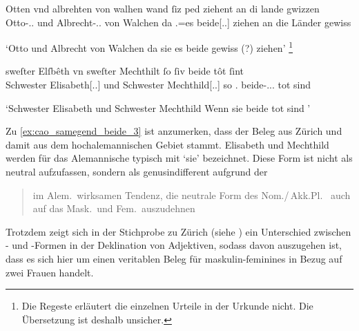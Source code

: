 \begin{exe}
\ex \label{ex:cao_samegend_beide}
\begin{xlist}

	\ex \label{ex:cao_samegend_beide_2}
		\gll Otten vnd albrehten von walhen \textelp{} wand
			ſiz ped ziehent an di lande gwizzen \\
			Otto-\Acc.\Sg.\MascM{} und Albrecht-\Acc.\Sg.\MascM{} von Walchen
			{} da \Tpl\subM.\Nom{}=es beide[\Nom.\Pl.\MascM] ziehen an die
			Länder gewiss \\
		\begin{taggedline}{\parencites(Salzburg, 1281)[\pno~491, 431.41, 432.38]{cao1}}
		\trans `Otto und Albrecht von Walchen \textelp{} da sie es beide
			gewiss (?)  ziehen'%
			\footnote{Die Regeste \autocite[80]{caor} erläutert die einzelnen
			Urteile in der Urkunde nicht. Die Übersetzung ist deshalb
			unsicher.}
		\end{taggedline}

	\ex \label{ex:cao_samegend_beide_3}
		\gll sweſter Elſbêth vn sweſter Mechthilt \textelp{} ſo
			ſiv beide tôt ſint \textelp{} \\
			Schwester Elisabeth[\Nom.\Sg.\FemF] und Schwester
			Mechthild[\Nom.\Sg.\FemF] {} so	\Tpl\subF.\Nom{}
			beide-\Nom.\Pl.\FemF.\St{} tot sind {} \\
		\begin{taggedline}{\parencites(Zürich, 1291)[\pno~1504, 679.12--13]{cao2}}
		\trans `Schwester Elisabeth und Schwester Mechthild \textelp{}
			Wenn sie beide tot sind \textelp{}'
		\end{taggedline}
\end{xlist}
\end{exe}

Zu \cref{ex:cao_samegend_beide_3} ist anzumerken, dass der Beleg aus Zürich und
damit aus dem hochalemannischen Gebiet stammt. Elisabeth und Mechthild werden
für das Alemannische typisch mit  `sie' bezeichnet. Diese Form
ist nicht als neutral aufzufassen, sondern als genusindifferent aufgrund der
\blockcquote[395]{ksw2}{im Alem.\ wirksamen Tendenz, die neutrale Form
 des Nom./\,Akk.Pl.\ \textelp{} auch auf das Mask.\ und Fem.\
auszudehnen}. Trotzdem zeigt sich in der Stichprobe zu Zürich (siehe
\cpageref{par:adjzuerich}) ein Unterschied zwischen \norm{e}- und
\norm{iu}-Formen in der Deklination von Adjektiven, sodass davon auszugehen ist,
dass es sich hier um einen veritablen Beleg für maskulin-feminines \norm{bėide} in Bezug auf zwei
Frauen handelt.

